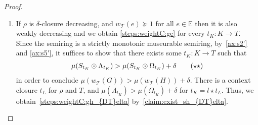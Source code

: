 \begin{proof}
\begin{enumerate}
        \item
            If $\rho$ is $\delta$-closure decreasing, and $w_\mathcal{T}(e) \succeq 1$ for all $e \in \mathbb{E}$ then it is also weakly decreasing and we obtain \eqref{steps:weightC:ge} for every $t_K : K \to T$.
            Since the semiring is a strictly monotonic museurable semiring,  by~\autoref{ax:s2'} and \eqref{ax:s5'}, it suffices to show that there exists some $t_K : K \to T$ such that 
            \begin{align}
                \mu(S_{t_K} \odot \Lambda_{t_K}) > \mu(S_{t_K} \odot \Omega_{t_K}) + 
                \delta
              \tag{$\star\star$}\label{steps:weightC:gh_{DT}elta}
            \end{align}
            in order to conclude $ \mu(w_\mathcal{T}(G)) > \mu(w_\mathcal{T}(H)) + \delta$.
            There is a context closure $t_L$ for $\rho$ and $T$, and
            $\mu(\Lambda_{t_K}) > \mu(\Omega_{t_K}) + \delta$
            for $t_K = l \star t_L$. Thus, we obtain~\eqref{steps:weightC:gh_{DT}elta} by~\ref{claim:exist_sh_{DT}elta}.
    \end{enumerate}
\end{proof} 

